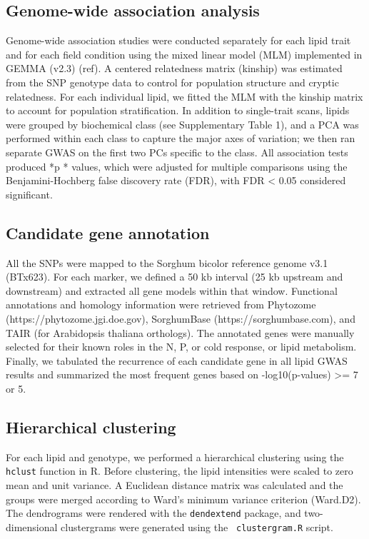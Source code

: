 \documentclass[10pt,letterpaper]{article}
\begin{document}
\subsection*{Genome-wide association analysis}  
Genome-wide association studies were conducted separately for each lipid trait and for each field condition using the mixed linear model (MLM) implemented in GEMMA (v2.3) (ref).  A centered relatedness matrix (kinship) was estimated from the SNP genotype data to control for population structure and cryptic relatedness.  For each individual lipid, we fitted the MLM with the kinship matrix to account for population stratification.  In addition to single-trait scans, lipids were grouped by biochemical class (see Supplementary Table 1), and a PCA was performed within each class to capture the major axes of variation; we then ran separate GWAS on the first two PCs specific to the class.  All association tests produced *p * values, which were adjusted for multiple comparisons using the Benjamini-Hochberg false discovery rate (FDR), with FDR < 0.05 considered significant.

\subsection*{Candidate gene annotation}  
All the SNPs were mapped to the Sorghum bicolor reference genome v3.1 (BTx623).  For each marker, we defined a 50 kb interval (25 kb upstream and downstream) and extracted all gene models within that window.  Functional annotations and homology information were retrieved from Phytozome (https://phytozome.jgi.doe.gov), SorghumBase (https://sorghumbase.com), and TAIR (for Arabidopsis thaliana orthologs).  The annotated genes were manually selected for their known roles in the N, P, or cold response, or lipid metabolism.  Finally, we tabulated the recurrence of each candidate gene in all lipid GWAS results and summarized the most frequent genes based on -log10(p-values) >= 7 or 5.

\subsection*{Hierarchical clustering}
For each lipid and genotype, we performed a hierarchical clustering using the \texttt{hclust} function in R.  Before clustering, the lipid intensities were scaled to zero mean and unit variance.  A Euclidean distance matrix was calculated and the groups were merged according to Ward's minimum variance criterion (Ward.D2).  The dendrograms were rendered with the \texttt{dendextend} package, and two-dimensional clustergrams were generated using the \texttt{ clustergram.R} script.  
\end{document}
